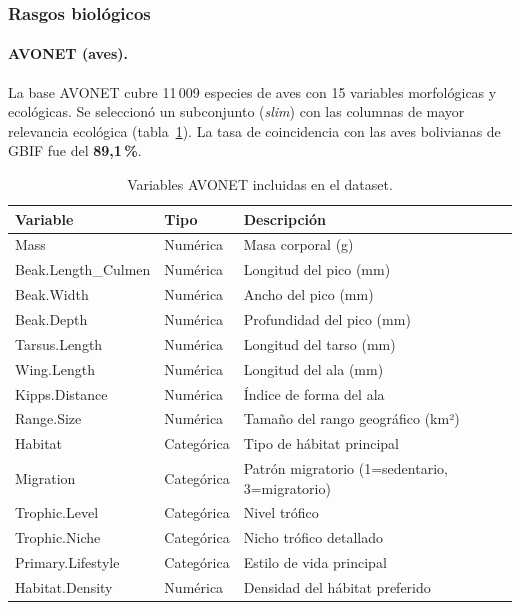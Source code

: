\documentclass[12pt,a4paper]{article}
\begin{document}
\subsubsection{Rasgos biológicos}

\paragraph{AVONET (aves).}
La base AVONET \cite{tobias2022avonet} cubre 11\,009 especies de aves con 15 variables morfológicas
y ecológicas.  Se seleccionó un subconjunto (\textit{slim}) con las columnas de mayor relevancia
ecológica (tabla~\ref{tab:avonet}).  La tasa de coincidencia con las aves bolivianas de GBIF fue
del \textbf{89,1\,\%}.

\begin{table}[H]
  \centering\small
  \caption{Variables AVONET incluidas en el dataset.}
  \label{tab:avonet}
  \begin{tabular}{lll}
    \toprule
    \textbf{Variable} & \textbf{Tipo} & \textbf{Descripción} \\
    \midrule
    Mass              & Numérica   & Masa corporal (g) \\
    Beak.Length\_Culmen & Numérica & Longitud del pico (mm) \\
    Beak.Width        & Numérica   & Ancho del pico (mm) \\
    Beak.Depth        & Numérica   & Profundidad del pico (mm) \\
    Tarsus.Length     & Numérica   & Longitud del tarso (mm) \\
    Wing.Length       & Numérica   & Longitud del ala (mm) \\
    Kipps.Distance    & Numérica   & Índice de forma del ala \\
    Range.Size        & Numérica   & Tamaño del rango geográfico (km²) \\
    Habitat           & Categórica & Tipo de hábitat principal \\
    Migration         & Categórica & Patrón migratorio (1=sedentario, 3=migratorio) \\
    Trophic.Level     & Categórica & Nivel trófico \\
    Trophic.Niche     & Categórica & Nicho trófico detallado \\
    Primary.Lifestyle & Categórica & Estilo de vida principal \\
    Habitat.Density   & Numérica   & Densidad del hábitat preferido \\
    \bottomrule
  \end{tabular}
\end{table}
\end{document}
